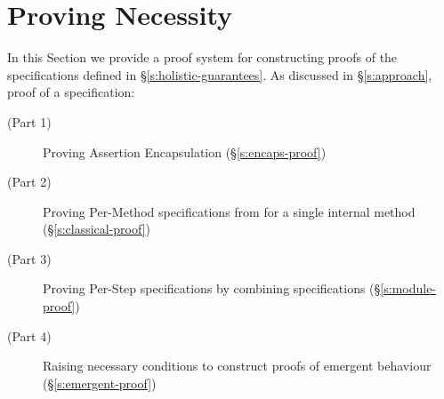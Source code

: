 \section{Proving Necessity}
\label{s:inference}

In this Section we provide a proof system for constructing 
proofs of the \Nec specifications defined in \S \ref{s:holistic-guarantees}.
As discussed in \S \ref{s:approach},
 proof of a \Nec specification:
\begin{description} 
\item[(Part 1)]
Proving Assertion Encapsulation (\S \ref{s:encaps-proof})
\item[(Part 2)]
Proving Per-Method \Nec specifications from \funcSpecs for a single internal method (\S \ref{s:classical-proof})
\item[(Part 3)]
Proving Per-Step \Nec specifications by combining  \Nec specifications (\S \ref{s:module-proof})
\item[(Part 4)]
Raising necessary conditions to construct proofs of emergent behaviour (\S \ref{s:emergent-proof})
\end{description}



